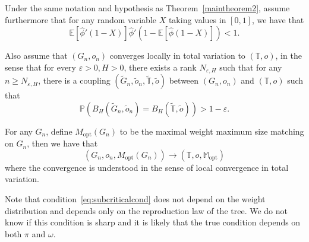 \documentclass[11pt]{article}
\newcommand{\eps}{\varepsilon}
\begin{document}
\begin{theorem}\label{th:reciproquegamarnik}
    Under the same notation and hypothesis as Theorem~\ref{maintheorem2}, assume furthermore that for any random variable $X$ taking values in $[0,1]$, we have that
    \begin{equation}\label{eq:subcriticalcond}
        \mathbb{E}\left[ \hat{\phi}'(1-X)\right] \hat{\phi}'\left(1-\mathbb{E}\left[\hat{\phi}(1-X)\right]\right) < 1.
    \end{equation}

    Also assume that $(G_n,o_n)$ converges locally in total variation to $(\mathbb{T},o)$, in the sense that for every $\varepsilon>0,H>0$, there exists a rank $N_{\eps,H}$ such that for any $n \geq N_{\eps,H}$, there is a coupling $(\tilde{G}_n,\tilde{o}_n,\tilde{\mathbb{T}},\tilde{o})$  between $(G_n,o_n)$ and $(\mathbb{T},o)$ such that 
    \begin{equation}\label{eq:TVlocal}
        \mathbb{P}\left(B_H(\tilde{G}_n,\tilde{o}_n)=B_H(\tilde{\mathbb{T}},\tilde{o})\right) > 1-\varepsilon.
    \end{equation}

    For any $G_n$, define $M_{\mathrm{opt}}(G_n)$ to be the maximal weight maximum size matching on $G_n$, then we have that 
    \[ (G_n,o_n,M_{\mathrm{opt}}(G_n)) \longrightarrow (\mathbb{T},o,\mathbb{M}_{\mathrm{opt}})  \]
    where the convergence is understood in the sense of local convergence in total variation.
\end{theorem}
\begin{remark}
    Note that condition~\eqref{eq:subcriticalcond} does not depend on the weight distribution and depends only on the reproduction law of the tree. We do not know if this condition is sharp and it is likely that the true condition depends on both $\pi$ and $\omega$.
\end{remark}
\end{document}
